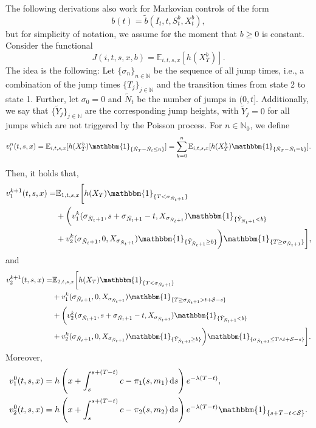 \documentclass[a4paper]{scrartcl}
\theoremstyle{remark}
\theoremstyle{definition}
\numberwithin{equation}{section}
\newcommand*\diff{\mathop{}\!\mathrm{d}}
\newcommand{\ind}{\mathbbm{1}_}
\begin{document}
The following derivations also work for Markovian controls of the form 
\begin{equation*}
   b(t)=\tilde{b}(I_t,t,S_t^b,X_t^b),
\end{equation*} but for simplicity of notation, we assume for the moment that $b \geq 0$ is constant. Consider the functional
\begin{equation*}
    J(i,t,s,x,b)=\mathbb{E}_{i,t,s,x}[h(X^b_T)].
\end{equation*}
The idea is the following: Let $\{\sigma_n\}_{n \in \mathbb{N}}$ be the sequence of all jump times, i.e., a combination of the jump times $\{T_j\}_{j \in \mathbb{N}}$ and the transition times from state 2 to state 1. Further, let $\sigma_0=0$ and $\tilde{N}_t$ be the number of jumps in $(0,t]$. Additionally, we say that $\{\tilde{Y}_j\}_{j \in \mathbb{N}}$ are the corresponding jump heights, with $\tilde{Y}_j=0$ for all jumps which are not triggered by the Poisson process. For $n \in \mathbb{N}_0$, we define
\begin{equation*}
    v_i^n(t,s,x)=\mathbb{E}_{i,t,s,x}[h(X^b_T)\ind{\{\tilde{N}_T-\tilde{N}_t\leq n\}}]=\sum_{k=0}^n \mathbb{E}_{i,t,s,x}[h(X^b_T)\ind{\{\tilde{N}_T-\tilde{N}_t=k\}}].
\end{equation*}

Then, it holds that,
\begin{align*}
    v_1^{k+1}(t,s,x)=&\mathbb{E}_{1,t,s,x} \biggl[h(X_T)\mathbbm{1}_{\{T<\sigma_{\tilde{N}_t+1}\}} \\&+\biggl(v_1^k(\sigma_{\tilde{N}_t+1},s+\sigma_{\tilde{N}_t+1}-t,X_{\sigma_{\tilde{N}_t+1}})\ind{\{\tilde{Y}_{\tilde{N}_t+1}<b\}}  \\&+v_2^k(\sigma_{\tilde{N}_t+1},0,X_{\sigma_{\tilde{N}_t+1}})  \ind{\{\tilde{Y}_{\tilde{N}_t+1}\geq b\}}  \biggr) \mathbbm{1}_{\{T\geq \sigma_{\tilde{N}_t+1}\}} \biggr],
\end{align*}
and
\begin{align*}
    v_2^{k+1}(t,s,x)=&\mathbb{E}_{2,t,s,x} \biggl[h(X_T)\mathbbm{1}_{\{T<\sigma_{\tilde{N}_t+1}\}} \\&+v_1^k(\sigma_{\tilde{N}_t+1},0,X_{\sigma_{\tilde{N}_t+1}}) \ind{\{ T\geq \sigma_{\tilde{N}_t+1}>t+\mathcal{S}-s \}}\\
    &+ \biggl(v_2^k(\sigma_{\tilde{N}_t+1},s+\sigma_{\tilde{N}_t+1}-t,X_{\sigma_{\tilde{N}_t+1}})\ind{\{\tilde{Y}_{\tilde{N}_t+1}<b\}} \\&+v_2^k(\sigma_{\tilde{N}_t+1},0,X_{\sigma_{\tilde{N}_t+1}})  \ind{\{\tilde{Y}_{\tilde{N}_t+1}\geq b\}}  \biggr) \mathbbm{1}_{\{\sigma_{\tilde{N}_t+1} \leq T\wedge t+\mathcal{S}-s \}} \biggr].
\end{align*}
Moreover,
\begin{align*}
    &v_1^0(t,s,x)=h\left(x+\int_{s}^{s+(T-t)}c-\pi_1(s,m_1)\diff s\right)e^{-\lambda(T-t)},\\
     &v_2^0(t,s,x)=h\left(x+\int_{s}^{s+(T-t)}c-\pi_2(s,m_2)\diff s\right) e^{-\lambda(T-t)} \ind{\{s+T-t< \mathcal{S}\}}.
\end{align*}
\end{document}
